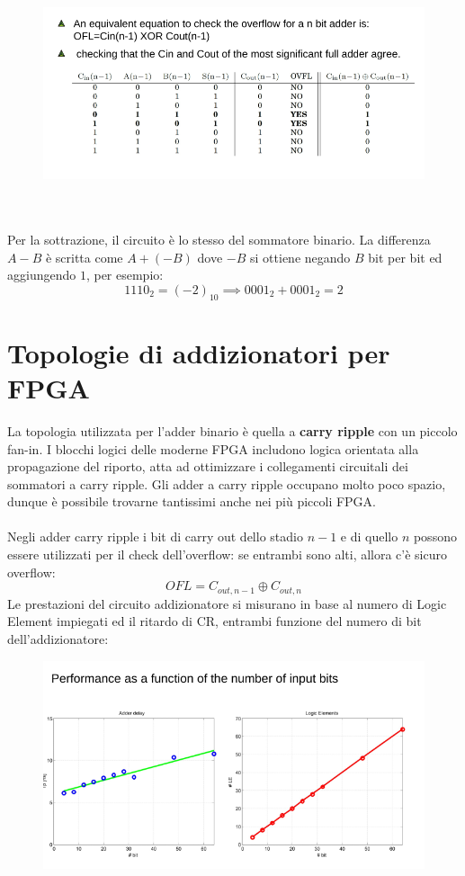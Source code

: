 \documentclass{book}
\begin{document}
        \begin{figure}[h!]
            \centering
            \includegraphics[width=0.75\linewidth]{img/Chapt10img5.png}
        \end{figure}
        \\ \\
        Per la sottrazione, il circuito è lo stesso del sommatore binario. La differenza $A-B$ è scritta come $A+(-B)$ dove $-B$ si ottiene negando $B$ bit per bit ed aggiungendo $1$, per esempio:
        \begin{equation}
            1110_{2} = (-2)_{10} \implies 0001_{2}+0001_{2} = 2
        \end{equation}
    \section{Topologie di addizionatori per FPGA}
        La topologia utilizzata per l'adder binario è quella a \textbf{carry ripple} con un piccolo fan-in. I blocchi logici delle moderne FPGA includono logica orientata alla propagazione del riporto, atta ad ottimizzare i collegamenti circuitali dei sommatori a carry ripple. Gli adder a carry ripple occupano molto poco spazio, dunque è possibile trovarne tantissimi anche nei più piccoli FPGA. \\ \\
        Negli adder carry ripple i bit di carry out dello stadio $n-1$ e di quello $n$ possono essere utilizzati per il check dell'overflow: se entrambi sono alti, allora c'è sicuro overflow:
        \begin{equation}
            OFL = C_{out, n-1} \oplus C_{out, n}
        \end{equation}
        Le prestazioni del circuito addizionatore si misurano in base al numero di Logic Element impiegati ed il ritardo di CR, entrambi funzione del numero di bit dell'addizionatore:
        \begin{figure}[h!]
            \centering
            \includegraphics[width=0.75\linewidth]{img/chapt10img5.png}
        \end{figure}
\end{document}
